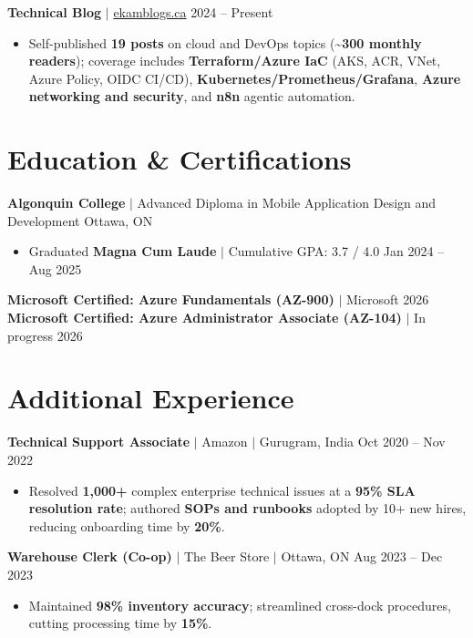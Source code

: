 \documentclass[11pt,a4paper]{article}
\begin{document}
\vspace{4pt}

\textbf{Technical Blog} $|$ \href{https://www.ekamblogs.ca}{ekamblogs.ca} \hfill 2024 -- Present
\begin{itemize}
    \item Self-published \textbf{19 posts} on cloud and DevOps topics (\textasciitilde\textbf{300 monthly readers}); coverage includes \textbf{Terraform/Azure IaC} (AKS, ACR, VNet, Azure Policy, OIDC CI/CD), \textbf{Kubernetes/Prometheus/Grafana}, \textbf{Azure networking and security}, and \textbf{n8n} agentic automation.
\end{itemize}

\section{Education \& Certifications}

\textbf{Algonquin College} $|$ Advanced Diploma in Mobile Application Design and Development \hfill Ottawa, ON
\begin{itemize}
    \item Graduated \textbf{Magna Cum Laude} $|$ Cumulative GPA: 3.7 / 4.0 \hfill Jan 2024 -- Aug 2025
\end{itemize}
\textbf{Microsoft Certified: Azure Fundamentals (AZ-900)} $|$ Microsoft \hfill 2026 \\
\textbf{Microsoft Certified: Azure Administrator Associate (AZ-104)} $|$ In progress \hfill 2026

\section{Additional Experience}

\textbf{Technical Support Associate} $|$ Amazon $|$ Gurugram, India \hfill Oct 2020 -- Nov 2022
\begin{itemize}
    \item Resolved \textbf{1,000+} complex enterprise technical issues at a \textbf{95\% SLA resolution rate}; authored \textbf{SOPs and runbooks} adopted by 10+ new hires, reducing onboarding time by \textbf{20\%}.
\end{itemize}

\vspace{4pt}

\textbf{Warehouse Clerk (Co-op)} $|$ The Beer Store $|$ Ottawa, ON \hfill Aug 2023 -- Dec 2023
\begin{itemize}
    \item Maintained \textbf{98\% inventory accuracy}; streamlined cross-dock procedures, cutting processing time by \textbf{15\%}.
\end{itemize}
\end{document}
